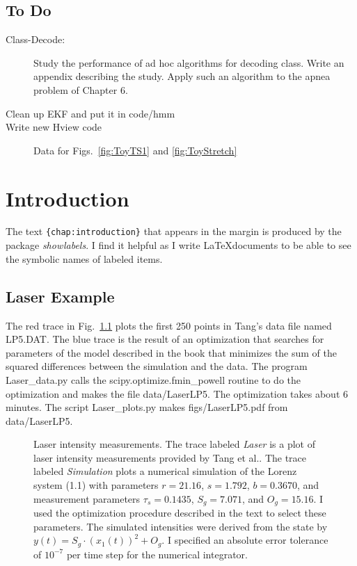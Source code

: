 \documentclass[prelim,showlabels]{book}
\newcommand{\Tsamp}{\tau_s }
\newcommand{\ti}[2]{{#1}{(#2)}}                  %
\newcommand{\etal}{et al.\xspace}
\begin{document}
\section*{To Do}
\begin{description}
\item[Class-Decode:] Study the performance of ad hoc algorithms for
  decoding class.  Write an appendix describing the study.  Apply such
  an algorithm to the apnea problem of Chapter 6.
\item[Clean up EKF and put it in code/hmm]
\item[Write new Hview code] Data for Figs.~\ref{fig:ToyTS1} and
  \ref{fig:ToyStretch}

\end{description}

\mainmatter
\chapter{Introduction}
\label{chap:introduction}

The text \texttt{\{chap:introduction\}}
that appears in the margin is produced by the package
\emph{showlabels}.  I find it helpful as I write \LaTeX documents to
be able to see the symbolic names of labeled items.

\section{Laser Example}

The red trace in Fig.~\ref{fig:LaserLP5} plots the first 250 points in
Tang's data file named LP5.DAT.  The blue trace is the result of an
optimization that searches for parameters of the model described in
the book that minimizes the sum of the squared differences between the
simulation and the data.  The program Laser\_data.py calls the
scipy.optimize.fmin\_powell routine to do the optimization and makes
the file data/LaserLP5.  The optimization takes about 6 minutes.  The
script Laser\_plots.py makes figs/LaserLP5.pdf from data/LaserLP5.
\begin{figure}[htbp]
  \caption[Laser intensity measurements.]%
  {Laser intensity measurements.  The trace labeled \emph{Laser} is a
    plot of laser intensity measurements provided by Tang \etal.  The
    trace labeled \emph{Simulation} plots a numerical simulation of
    the Lorenz system (1.1) with parameters $r=21.16$,
    $s=1.792$, $b=0.3670$, and measurement parameters $\Tsamp=0.1435$,
    $S_g = 7.071$, and $O_g =15.16$.  I used the optimization
    procedure described in the text to select these parameters.  The
    simulated intensities were derived from the state by $\ti{y}{t} =
    S_g \cdot (\ti{x_1}{t})^2 + O_g$.  I specified an absolute error
    tolerance of $10^{-7}$ per time step for the numerical
    integrator.}
  \label{fig:LaserLP5}
\end{figure}
\end{document}
